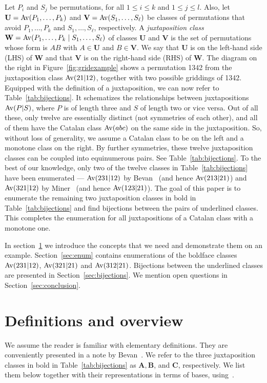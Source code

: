 Let $P_i$ and $S_j$ be permutations, for all $1\leq i\leq k$ and $1 \leq j \leq l$. Also, let $\mathbf{U} = \mathrm{Av}(P_1,\ldots,P_k)$ and $\mathbf{V} = \mathrm{Av}(S_1,\ldots,S_\ell)$ be  classes of permutations that avoid $P_1,\ldots, P_k$ and $S_1,\ldots,S_\ell$, respectively. A \emph{juxtaposition class} $\mathbf{W} = \mathrm{Av}(P_1,\ldots,P_k\mid S_1, \ldots, S_\ell)$ of classes $\mathbf{U}$ and $\mathbf{V}$ is the set of permutations whose form is $AB$ with $A\in \mathbf{U}$ and $B \in \mathbf{V}$. We say that $\mathbf{U}$ is on the left-hand side (LHS) of $\mathbf{W}$ and that $\mathbf{V}$ is on the right-hand side (RHS) of $\mathbf{W}$. The diagram on the right in Figure~\ref{fig:gridexample} shows a permutation 1342 from the juxtaposition class $\mathrm{Av}(21|12)$, together with two possible griddings of 1342. Equipped with the definition of a juxtaposition, we can now refer to Table~\ref{tab:bijections}. It schematizes the relationships between juxtapositions $\mathrm{Av}(P|S)$, where $P$ is of length three and $S$ of length two or vice versa. Out of all these, only twelve are essentially distinct (not symmetries of each other), and all of them have the Catalan class $\mathrm{Av}(abc)$ on the same side in the juxtaposition. So, without loss of generality, we assume a Catalan class to be on the left and a monotone class on the right. By further symmetries, these twelve juxtaposition classes can be coupled into equinumerous pairs. See Table~\ref{tab:bijections}. To the best of our knowledge, only two of the twelve classes in Table~\ref{tab:bijections} have been enumerated --- $\mathrm{Av}(231|12)$ by Bevan~\cite{bevan-new} (and hence $\mathrm{Av}(213|21)$) and $\mathrm{Av}(321|12)$ by Miner~\cite{miner16twobyfour} (and hence $\mathrm{Av}(123|21)$). The goal of this paper is to enumerate the remaining two juxtaposition classes in bold in Table~\ref{tab:bijections} and find bijections between the pairs of underlined classes. This completes the enumeration for all juxtapositions of a Catalan class with a monotone one.

In section~\ref{sec:catalanjuxt_defs} we introduce the concepts that we need and demonstrate them on an example. Section~\ref{sec:enum} contains enumerations of the boldface classes $\mathrm{Av}(231|12)$, $\mathrm{Av}(321|21)$ and $\mathrm{Av}(312|21)$.  Bijections between the underlined classes are presented in Section~\ref{sec:bijections}. We mention open questions in Section~\ref{sec:conclusion}.

\section{Definitions and overview}
\label{sec:catalanjuxt_defs}
We assume the reader is familiar with elementary definitions. They are conveniently presented in a note by Bevan~\cite{bevan2015defs}.  We refer to the three juxtaposition classes in bold in Table~\ref{tab:bijections} as $\mathbf{A}, \mathbf{B}$, and $\mathbf{C}$, respectively. We list them below together with their representations in terms of bases, using~\cite{atkinson1997restricted}.

